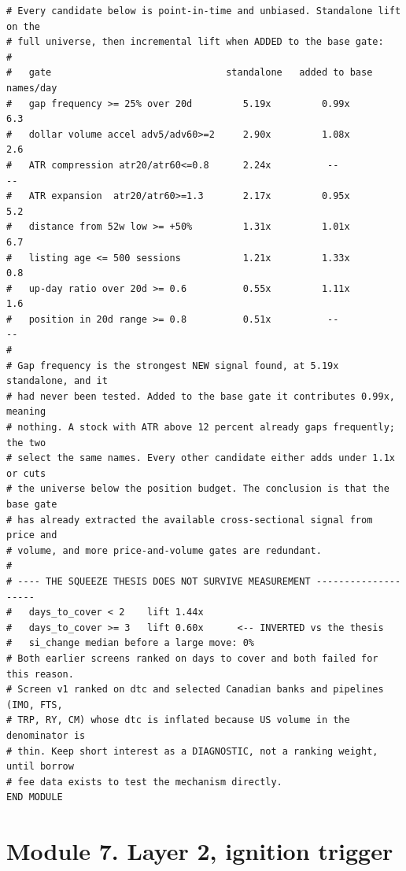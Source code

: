 \documentclass[10pt]{article}
\begin{document}
\begin{lstlisting}
# Every candidate below is point-in-time and unbiased. Standalone lift on the
# full universe, then incremental lift when ADDED to the base gate:
#
#   gate                               standalone   added to base   names/day
#   gap frequency >= 25% over 20d         5.19x         0.99x          6.3
#   dollar volume accel adv5/adv60>=2     2.90x         1.08x          2.6
#   ATR compression atr20/atr60<=0.8      2.24x          --             --
#   ATR expansion  atr20/atr60>=1.3       2.17x         0.95x          5.2
#   distance from 52w low >= +50%         1.31x         1.01x          6.7
#   listing age <= 500 sessions           1.21x         1.33x          0.8
#   up-day ratio over 20d >= 0.6          0.55x         1.11x          1.6
#   position in 20d range >= 0.8          0.51x          --             --
#
# Gap frequency is the strongest NEW signal found, at 5.19x standalone, and it
# had never been tested. Added to the base gate it contributes 0.99x, meaning
# nothing. A stock with ATR above 12 percent already gaps frequently; the two
# select the same names. Every other candidate either adds under 1.1x or cuts
# the universe below the position budget. The conclusion is that the base gate
# has already extracted the available cross-sectional signal from price and
# volume, and more price-and-volume gates are redundant.
#
# ---- THE SQUEEZE THESIS DOES NOT SURVIVE MEASUREMENT --------------------
#   days_to_cover < 2    lift 1.44x
#   days_to_cover >= 3   lift 0.60x      <-- INVERTED vs the thesis
#   si_change median before a large move: 0%
# Both earlier screens ranked on days to cover and both failed for this reason.
# Screen v1 ranked on dtc and selected Canadian banks and pipelines (IMO, FTS,
# TRP, RY, CM) whose dtc is inflated because US volume in the denominator is
# thin. Keep short interest as a DIAGNOSTIC, not a ranking weight, until borrow
# fee data exists to test the mechanism directly.
END MODULE
\end{lstlisting}

\section{Module 7. Layer 2, ignition trigger}
\end{document}
